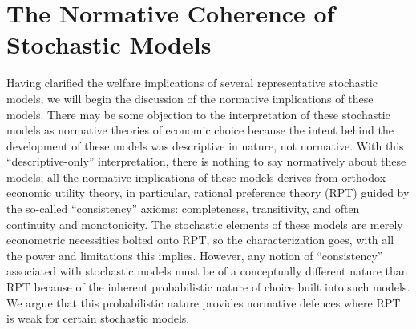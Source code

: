 \documentclass[../main.tex]{subfiles}
\begin{document}
\section{The Normative Coherence of Stochastic Models}

Having clarified the welfare implications of several representative stochastic models, we will begin the discussion of the normative implications of these models.
There may be some objection to the interpretation of these stochastic models as normative theories of economic choice because the intent behind the development of these models was descriptive in nature, not normative.
With this \enquote{descriptive-only} interpretation, there is nothing to say normatively about these models;
all the normative implications of these models derives from orthodox economic utility theory, in particular, rational preference theory (RPT) guided by the so-called \enquote{consistency}{\footnotemark} axioms: completeness, transitivity, and often{\footnotemark} continuity and monotonicity.
The stochastic elements of these models are merely econometric necessities bolted onto RPT, so the characterization goes, with all the power and limitations this implies.
However, any notion of \enquote{consistency} associated with stochastic models must be of a conceptually different nature than RPT because of the inherent probabilistic nature of choice built into such models.
We argue that this probabilistic nature provides normative defences where RPT is weak for certain stochastic models.

\addtocounter{footnote}{-2}
\end{document}
